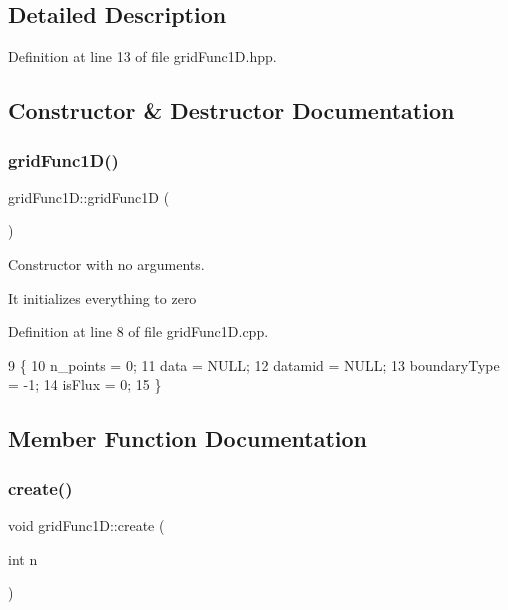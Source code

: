 \subsection{Detailed Description}


Definition at line 13 of file grid\+Func1\+D.\+hpp.



\subsection{Constructor \& Destructor Documentation}
\mbox{\label{classgridFunc1D_a014ccb9f69e514547d24998fd3f5523b}} 
\subsubsection{\texorpdfstring{grid\+Func1\+D()}{gridFunc1D()}}
{\footnotesize\ttfamily grid\+Func1\+D\+::grid\+Func1D (\begin{DoxyParamCaption}{ }\end{DoxyParamCaption})}



Constructor with no arguments. 

It initializes everything to zero 

Definition at line 8 of file grid\+Func1\+D.\+cpp.


\begin{DoxyCode}
9 \{
10   n\_points = 0;
11   data = NULL;
12   datamid = NULL;
13   boundaryType = -1;
14   isFlux = 0;
15 \}
\end{DoxyCode}


\subsection{Member Function Documentation}
\mbox{\label{classgridFunc1D_a0d33423ea192c516bfaf9c0cc77cd943}} 
\subsubsection{\texorpdfstring{create()}{create()}}
{\footnotesize\ttfamily void grid\+Func1\+D\+::create (\begin{DoxyParamCaption}\item[{int}]{n }\end{DoxyParamCaption})}



